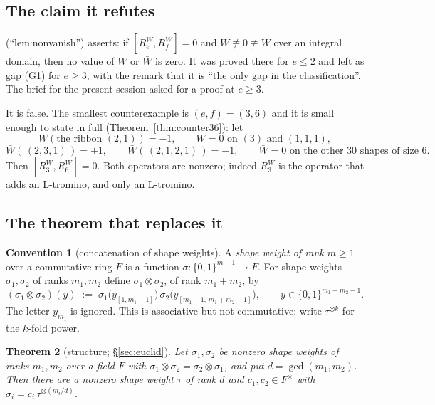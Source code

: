 \documentclass[11pt]{article}
\newtheorem{theorem}{Theorem}[section]
\theoremstyle{definition}
\newtheorem{convention}[theorem]{Convention}
\theoremstyle{remark}
\begin{document}
\subsection*{The claim it refutes}

\cite[Lemma 8.2]{Q149} (``\textsf{lem:nonvanish}'') asserts: if $[R_e^{W},R_f^{\bar W}]=0$
and $W\not\equiv0\not\equiv\bar W$ over an integral domain, then no value of $W$ or $\bar W$
is zero.  It was proved there for $e\le2$ and left as gap (G1) for $e\ge3$, with the remark
that it is ``the only gap in the classification''.  The brief for the present session asked
for a proof at $e\ge3$.

It is false.  The smallest counterexample is $(e,f)=(3,6)$ and it is small enough to state
in full (Theorem~\ref{thm:counter36}): let
\[
  W(\text{the ribbon }(2,1))=-1,\qquad W=0 \text{ on }(3)\text{ and }(1,1,1),
\]
\[
  \bar W(\,(2,3,1)\,)=+1,\qquad \bar W(\,(2,1,2,1)\,)=-1,\qquad
  \bar W=0 \text{ on the other } 30 \text{ shapes of size }6 .
\]
Then $[R_3^{W},R_6^{\bar W}]=0$.  Both operators are nonzero; indeed $R_3^{W}$ is the
operator that adds an L-tromino, and only an L-tromino.

\subsection*{The theorem that replaces it}

\begin{convention}[concatenation of shape weights]\label{conv:otimes}
A \emph{shape weight of rank $m\ge1$} over a commutative ring $F$ is a function
$\sigma:\{0,1\}^{m-1}\to F$.  For shape weights $\sigma_1,\sigma_2$ of ranks $m_1,m_2$
define $\sigma_1\otimes\sigma_2$, of rank $m_1+m_2$, by
\[
  (\sigma_1\otimes\sigma_2)(y)\;:=\;\sigma_1\bigl(y_{[1,m_1-1]}\bigr)\,
       \sigma_2\bigl(y_{[m_1+1,\,m_1+m_2-1]}\bigr),
  \qquad y\in\{0,1\}^{m_1+m_2-1} .
\]
The letter $y_{m_1}$ is ignored.  This is associative but not commutative; write
$\tau^{\otimes k}$ for the $k$-fold power.
\end{convention}

\begin{theorem}[structure; §\ref{sec:euclid}]\label{thm:structure0}
Let $\sigma_1,\sigma_2$ be nonzero shape weights of ranks $m_1,m_2$ over a field $F$ with
$\sigma_1\otimes\sigma_2=\sigma_2\otimes\sigma_1$, and put $d=\gcd(m_1,m_2)$.  Then there
are a nonzero shape weight $\tau$ of rank $d$ and $c_1,c_2\in F^{\times}$ with
$\sigma_i=c_i\,\tau^{\otimes(m_i/d)}$.
\end{theorem}
\end{document}
